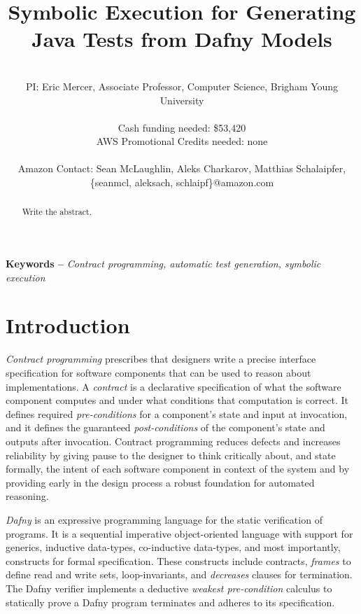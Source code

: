 \documentclass[11pt,onecolumn,notitlepage]{article}
\makeatletter
\renewcommand{\maketitle}{\bgroup\setlength{\parindent}{0pt}
\begin{flushleft}
  \Large{\textbf{\@title}}
  
  \normalsize{\@author}
\end{flushleft}\egroup
}
\makeatother
\begin{document}
\title{Symbolic Execution for Generating Java Tests from Dafny Models}
\author{\hfill \\
        PI: Eric Mercer, Associate Professor, Computer Science, Brigham Young University\\
        \hfill \\
        Cash funding needed: \$53,420 \\
        AWS Promotional Credits needed: none\\
        \hfill \\
        Amazon Contact: Sean McLaughlin, Aleks Charkarov, Matthias Schalaipfer, \{seanmcl, aleksach, schlaipf\}@amazon.com}

\maketitle

\begin{abstract}
  Write the abstract.
\end{abstract}

\providecommand{\keywords}[1]{\noindent\textbf{Keywords -- } \textit{#1}}
\keywords{Contract programming, automatic test generation, symbolic execution}

\section*{Introduction}
\emph{Contract programming} prescribes that designers write a precise interface specification for software components that can be used to reason about implementations. A \emph{contract} is a declarative specification of what the software component computes and under what conditions that computation is correct. It defines required \emph{pre-conditions} for a component's state and input at invocation, and it defines the guaranteed \emph{post-conditions} of the component's state and outputs after invocation. Contract programming reduces defects and increases reliability by giving pause to the designer to think critically about, and state formally, the intent of each software component in context of the system and by providing early in the design process a robust foundation for automated reasoning. 

\emph{Dafny} is an expressive programming language for the static verification of programs. It is a sequential imperative object-oriented language with support for generics, inductive data-types, co-inductive data-types, and most importantly, constructs for formal specification. These constructs include contracts, \emph{frames} to define read and write sets, loop-invariants, and \emph{decreases} clauses for termination. The Dafny verifier implements a deductive \emph{weakest pre-condition} calculus to statically prove a Dafny program terminates and adheres to its specification.  
\end{document}
